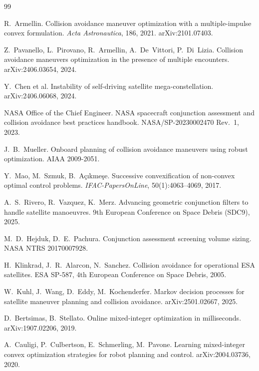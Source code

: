 \documentclass[11pt]{article}
\theoremstyle{definition}
\theoremstyle{remark}
\begin{document}
\begin{thebibliography}{99}

 R.~Armellin.
\newblock Collision avoidance maneuver optimization with a multiple-impulse convex formulation.
\newblock \emph{Acta Astronautica}, 186, 2021. arXiv:2101.07403.

 Z.~Pavanello, L.~Pirovano, R.~Armellin, A.~De~Vittori, P.~Di~Lizia.
\newblock Collision avoidance maneuvers optimization in the presence of multiple encounters.
\newblock arXiv:2406.03654, 2024.

 Y.~Chen et al.
\newblock Instability of self-driving satellite mega-constellation.
\newblock arXiv:2406.06068, 2024.

 NASA Office of the Chief Engineer.
\newblock NASA spacecraft conjunction assessment and collision avoidance best practices handbook.
\newblock NASA/SP-20230002470 Rev.~1, 2023.

 J.~B.~Mueller.
\newblock Onboard planning of collision avoidance maneuvers using robust optimization.
\newblock AIAA 2009-2051.

 Y.~Mao, M.~Szmuk, B.~A\c{c}{\i}kme\c{s}e.
\newblock Successive convexification of non-convex optimal control problems.
\newblock \emph{IFAC-PapersOnLine}, 50(1):4063--4069, 2017.

 A.~S.~Rivero, R.~Vazquez, K.~Merz.
\newblock Advancing geometric conjunction filters to handle satellite manoeuvres.
\newblock 9th European Conference on Space Debris (SDC9), 2025.

 M.~D.~Hejduk, D.~E.~Pachura.
\newblock Conjunction assessment screening volume sizing.
\newblock NASA NTRS 20170007928.

 H.~Klinkrad, J.~R.~Alarcon, N.~Sanchez.
\newblock Collision avoidance for operational ESA satellites.
\newblock ESA SP-587, 4th European Conference on Space Debris, 2005.

 W.~Kuhl, J.~Wang, D.~Eddy, M.~Kochenderfer.
\newblock Markov decision processes for satellite maneuver planning and collision avoidance.
\newblock arXiv:2501.02667, 2025.

 D.~Bertsimas, B.~Stellato.
\newblock Online mixed-integer optimization in milliseconds.
\newblock arXiv:1907.02206, 2019.

 A.~Cauligi, P.~Culbertson, E.~Schmerling, M.~Pavone.
\newblock Learning mixed-integer convex optimization strategies for robot planning and control.
\newblock arXiv:2004.03736, 2020.


\end{thebibliography}
\end{document}

